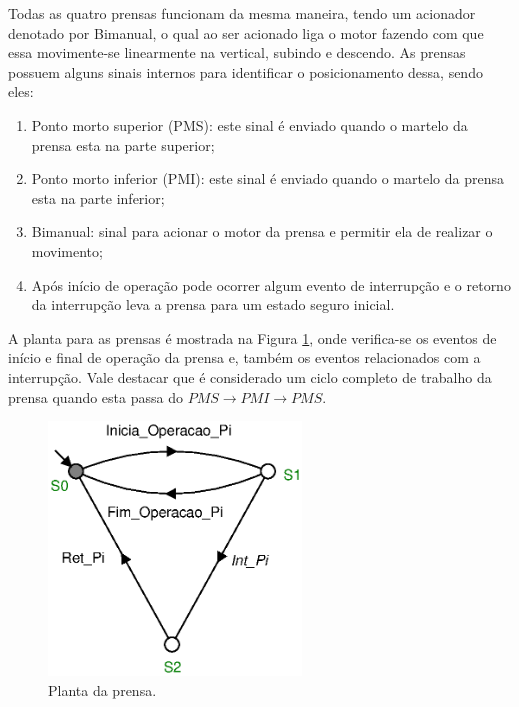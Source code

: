 Todas as quatro prensas funcionam da mesma maneira, tendo um acionador denotado por Bimanual, o qual ao ser acionado liga o motor fazendo com que essa movimente-se linearmente na vertical, subindo e descendo. As prensas possuem alguns sinais internos para identificar o posicionamento dessa, sendo eles:

\begin{enumerate}
	\item Ponto morto superior (PMS): este sinal é enviado quando o martelo da prensa esta na parte superior;
	
	\item Ponto morto inferior (PMI): este sinal é enviado quando o martelo da prensa esta na parte inferior;
	
	\item Bimanual: sinal para acionar o motor da prensa e permitir ela de realizar o movimento;
	
	\item Após início de operação pode ocorrer algum evento de interrupção e o retorno da interrupção leva a prensa para um estado seguro inicial.
\end{enumerate}

A planta para as prensas é mostrada na Figura \ref{fig:prensa}, onde verifica-se os eventos de início e final de operação da prensa e, também os eventos relacionados com a interrupção. Vale destacar que é considerado um ciclo completo de trabalho da prensa quando esta passa do $PMS \to PMI \to PMS$.

\begin{figure}[H]%
	\centering
	\includegraphics[width=0.6\textwidth]{imagens/Prensa.eps}
	\caption{Planta da prensa.}
	\label{fig:prensa}
\end{figure}



